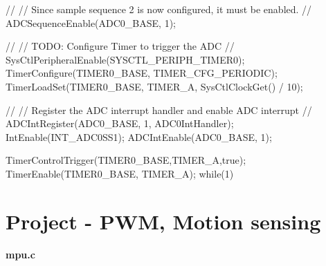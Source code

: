 \documentclass[12pt, a4paper]{article}
\begin{document}
\begin{code}
{    //
    // Since sample sequence 2 is now configured, it must be enabled.
    //
    ADCSequenceEnable(ADC0_BASE, 1);
    
    //
    // TODO: Configure Timer to trigger the ADC
    //
    SysCtlPeripheralEnable(SYSCTL_PERIPH_TIMER0);
    TimerConfigure(TIMER0_BASE, TIMER_CFG_PERIODIC);
    TimerLoadSet(TIMER0_BASE, TIMER_A, SysCtlClockGet() / 10);

    //
    // Register the ADC interrupt handler and enable ADC interrupt
    //
    ADCIntRegister(ADC0_BASE, 1, ADC0IntHandler);
    IntEnable(INT_ADC0SS1);
    ADCIntEnable(ADC0_BASE, 1);

    TimerControlTrigger(TIMER0_BASE,TIMER_A,true);
    TimerEnable(TIMER0_BASE, TIMER_A);
    while(1) {
    }
}
\end{code}
\pagebreak
\section{Project - PWM, Motion sensing}
\textbf{mpu.c}
\end{document}
